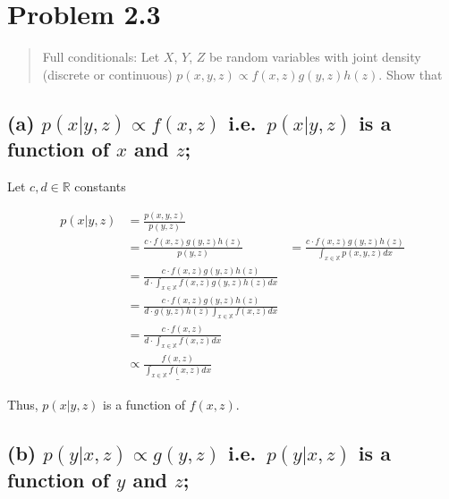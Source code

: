 \documentclass[
  letterpaper,
  DIV=11,
  numbers=noendperiod]{scrreprt}
\begin{document}
\hypertarget{problem-2.3}{%
\section{Problem 2.3}\label{problem-2.3}}

\begin{quote}
Full conditionals: Let \(X\), \(Y\), \(Z\) be random variables with
joint density (discrete or continuous)
\(p(x,y,z) \propto f(x,z)g(y,z)h(z)\). Show that
\end{quote}

\hypertarget{a-pxyz-propto-fxz-i.e.-pxyz-is-a-function-of-x-and-z}{%
\subsection{\texorpdfstring{(a) \(p(x|y,z) \propto f(x,z)\)
i.e.~\(p(x|y,z)\) is a function of \(x\) and
\(z\);}{(a) p(x\textbar y,z) \textbackslash propto f(x,z) i.e.~p(x\textbar y,z) is a function of x and z;}}\label{a-pxyz-propto-fxz-i.e.-pxyz-is-a-function-of-x-and-z}}

Let \(c, d\in \mathbb{R}\) constants

\[
\begin{aligned}
    p(x|y,z) &= \frac{p(x,y,z)}{p(y,z)}\\
             &= \frac{c\cdot f(x,z)g(y,z)h(z)}{p(y,z)}
             &= \frac{c\cdot f(x,z)g(y,z)h(z)}{\int_{x\in\mathbb{X}} p(x,y,z)dx}\\ 
             &= \frac{c\cdot f(x,z)g(y,z)h(z)}{d\cdot \int_{x\in \mathbb{X}} f(x,z)g(y,z)h(z) dx}\\ 
             &= \frac{c\cdot f(x,z)g(y,z)h(z)}{d\cdot g(y,z)h(z)\int_{x\in \mathbb{X}} f(x,z) dx}\\ 
             &= \frac{c\cdot f(x,z)}{d\cdot\int_{x\in \mathbb{X}} f(x,z) dx}\\
             &\propto \underline{\frac{f(x,z)}{\int_{x\in \mathbb{X}} f(x,z) dx}}
\end{aligned}
\]

Thus, \(p(x|y,z)\) is a function of \(f(x,z)\).

\hypertarget{b-pyxz-propto-gyz-i.e.-pyxz-is-a-function-of-y-and-z}{%
\subsection{\texorpdfstring{(b) \(p(y|x,z) \propto g(y,z)\)
i.e.~\(p(y|x,z)\) is a function of \(y\) and
\(z\);}{(b) p(y\textbar x,z) \textbackslash propto g(y,z) i.e.~p(y\textbar x,z) is a function of y and z;}}\label{b-pyxz-propto-gyz-i.e.-pyxz-is-a-function-of-y-and-z}}
\end{document}
